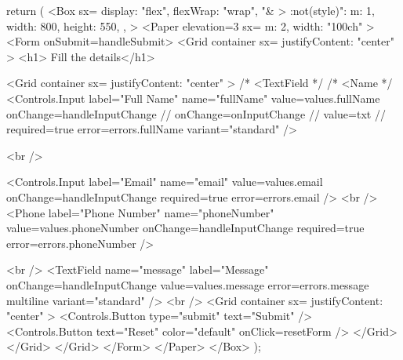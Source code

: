{  return (
    <Box
      sx={{
        display: "flex",
        flexWrap: "wrap",
        "& > :not(style)": {
          m: 1,
          width: 800,
          height: 550,
        },
      }}
    >
      <Paper elevation={3} sx={{ m: 2, width: "100ch" }}>
        <Form onSubmit={handleSubmit}>
          <Grid container sx={{ justifyContent: "center" }}>
            <h1> Fill the details</h1>

            <Grid container sx={{ justifyContent: "center" }}>
              {/* <TextField */}
              {/* <Name */}
              <Controls.Input
                label="Full Name"
                name="fullName"
                value={values.fullName}
                onChange={handleInputChange}
                // onChange={onInputChange}
                // value={txt}
                // required={true}
                error={errors.fullName}
                variant="standard"
              />

              <br />

              <Controls.Input
                label="Email"
                name="email"
                value={values.email}
                onChange={handleInputChange}
                required={true}
                error={errors.email}
              />
              <br />
              <Phone
                label="Phone Number"
                name="phoneNumber"
                value={values.phoneNumber}
                onChange={handleInputChange}
                required={true}
                error={errors.phoneNumber}
              />

              <br />
              <TextField
                name="message"
                label="Message"
                onChange={handleInputChange}
                value={values.message}
                error={errors.message}
                multiline
                variant="standard"
              />
              <br />
              <Grid container sx={{ justifyContent: "center" }}>
                <Controls.Button type="submit" text="Submit" />
                <Controls.Button
                  text="Reset"
                  color="default"
                  onClick={resetForm}
                />
              </Grid>
            </Grid>
          </Grid>
        </Form>
      </Paper>
    </Box>
  );
}
